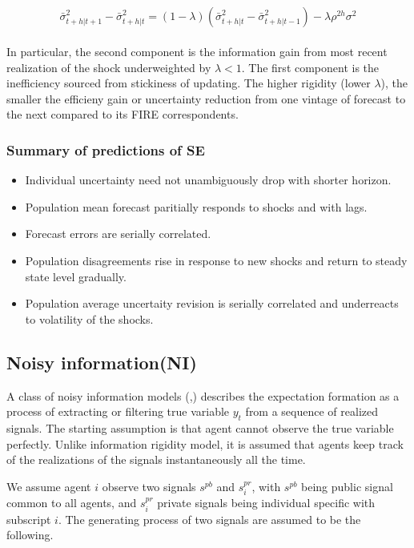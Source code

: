 \documentclass[]{article}
\begin{document}
\begin{eqnarray}\label{VarSEEq}
\begin{aligned}
\bar \sigma^2_{t+h|t+1} - \bar \sigma^2_{t+h|t} = (1-\lambda)(
\bar \sigma^2_{t+h|t} - \bar \sigma^2_{t+h|t-1}) -\lambda \rho^{2h} \sigma^2 
\end{aligned}
\end{eqnarray}

 In particular, the second component is the information gain from most recent realization of the shock underweighted by $\lambda<1$. The first component is the inefficiency sourced from stickiness of updating. The higher rigidity (lower $\lambda$), the smaller the efficieny gain or uncertainty reduction from one vintage of forecast to the next compared to its FIRE correspondents. 

\subsubsection{Summary of predictions of SE}

\begin{itemize}
\item Individual uncertainty need not unambiguously drop with shorter horizon. 
\item Population mean forecast paritially responds to shocks and with lags. 
\item Forecast errors are serially correlated. 
\item Population disagreements rise in response to new shocks and return to steady state level gradually. 
\item Population average uncertaity revision is serially correlated and underreacts to volatility of the shocks.
 
\end{itemize}

\subsection{Noisy information(NI)}

A class of noisy information models (\citet{},\citet{}) describes the expectation formation as a process of extracting or filtering true variable $y_t$ from a sequence of realized signals. The starting assumption is that agent cannot observe the true variable perfectly. Unlike information rigidity model, it is assumed that agents keep track of the realizations of the signals instantaneously all the time. 

We assume agent $i$ observe two signals $s^{pb}$ and $s^{pr}_i$, with $s^{pb}$ being public signal common to all agents, and $s^{pr}_i$ private signals being individual specific with subscript $i$. The generating process of two signals are assumed to be the following.
\end{document}
